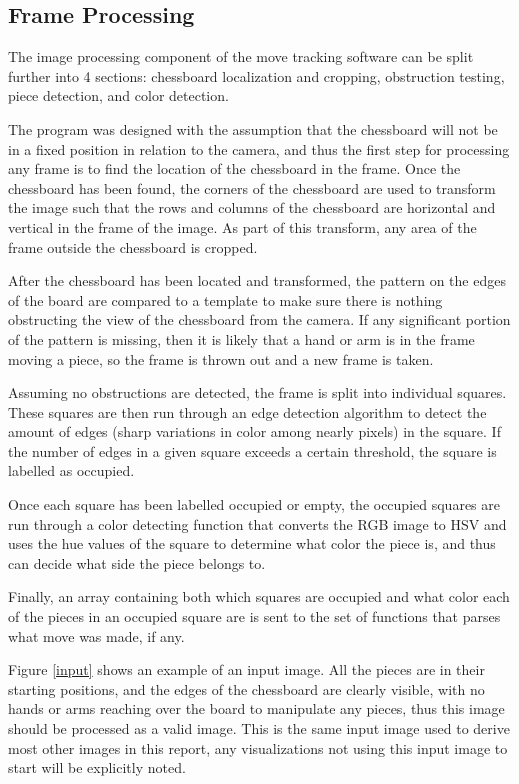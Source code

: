 \documentclass[journal]{IEEEtran}
\begin{document}
\vspace{12pt}

\subsection{Frame Processing}
The image processing component of the move tracking software can be split further into 4 sections: chessboard localization and cropping, obstruction testing, piece detection, and color detection. 

The program was designed with the assumption that the chessboard will not be in a fixed position in relation to the camera, and thus the first step for processing any frame is to find the location of the chessboard in the frame. Once the chessboard has been found, the corners of the chessboard are used to transform the image such that the rows and columns of the chessboard are horizontal and vertical in the frame of the image. As part of this transform, any area of the frame outside the chessboard is cropped.

After the chessboard has been located and transformed, the pattern on the edges of the board are compared to a template to make sure there is nothing obstructing the view of the chessboard from the camera. If any significant portion of the pattern is missing, then it is likely that a hand or arm is in the frame moving a piece, so the frame is thrown out and a new frame is taken.

Assuming no obstructions are detected, the frame is split into individual squares. These squares are then run through an edge detection algorithm to detect the amount of edges (sharp variations in color among nearly pixels) in the square. If the number of edges in a given square exceeds a certain threshold, the square is labelled as occupied.

Once each square has been labelled occupied or empty, the occupied squares are run through a color detecting function that converts the RGB image to HSV and uses the hue values of the square to determine what color the piece is, and thus can decide what side the piece belongs to.

Finally, an array containing both which squares are occupied and what color each of the pieces in an occupied square are is sent to the set of functions that parses what move was made, if any.

Figure \ref{input} shows an example of an input image. All the pieces are in their starting positions, and the edges of the chessboard are clearly visible, with no hands or arms reaching over the board to manipulate any pieces, thus this image should be processed as a valid image. This is the same input image used to derive most other images in this report, any visualizations not using this input image to start will be explicitly noted.
\end{document}
